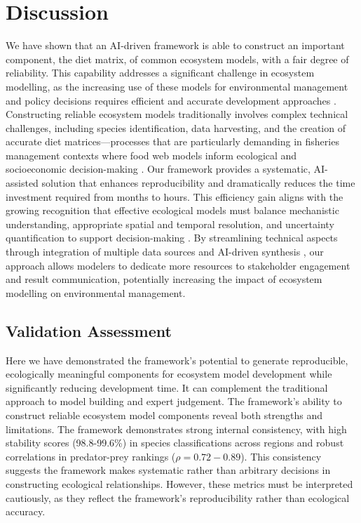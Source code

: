 \section{Discussion}

We have shown that an AI-driven framework is able to construct an important component, the diet matrix, of common ecosystem models, with a fair degree of reliability. This capability addresses a significant challenge in ecosystem modelling, as the increasing use of these models for environmental management and policy decisions requires efficient and accurate development approaches \citep{weiskopf2022increasing, schuwirth2019make}. Constructing reliable ecosystem models traditionally involves complex technical challenges, including species identification, data harvesting, and the creation of accurate diet matrices—processes that are particularly demanding in fisheries management contexts where food web models inform ecological and socioeconomic decision-making \citep{chakravorty2024systematic}. Our framework provides a systematic, AI-assisted solution that enhances reproducibility and dramatically reduces the time investment required from months to hours. This efficiency gain aligns with the growing recognition that effective ecological models must balance mechanistic understanding, appropriate spatial and temporal resolution, and uncertainty quantification to support decision-making \citep{schuwirth2019make}. By streamlining technical aspects through integration of multiple data sources \citep{Christensen2004, Colleter2015} and AI-driven synthesis \citep{spillias2024human, Noleto2024}, our approach allows modelers to dedicate more resources to stakeholder engagement and result communication, potentially increasing the impact of ecosystem modelling on environmental management.

\subsection{Validation Assessment}

Here we have demonstrated the framework's potential to generate reproducible, ecologically meaningful components for ecosystem model development while significantly reducing development time. It can complement the traditional approach to model building and expert judgement. The framework's ability to construct reliable ecosystem model components reveal both strengths and limitations. The framework demonstrates strong internal consistency, with high stability scores (98.8-99.6\%) in species classifications across regions and robust correlations in predator-prey rankings ($\rho = 0.72-0.89$). This consistency suggests the framework makes systematic rather than arbitrary decisions in constructing ecological relationships. However, these metrics must be interpreted cautiously, as they reflect the framework's reproducibility rather than ecological accuracy.

